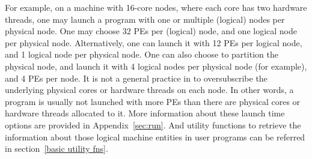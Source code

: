 For example, on a machine with 16-core nodes, where each core has two
hardware threads, one may launch a \charmpp{} program with one or multiple
(logical) nodes per physical node. One may choose 32 PEs per (logical) node,
and one logical node per physical node. Alternatively, one can launch
it with 12 PEs per logical node, and 1 logical node per physical
node. One can also choose to partition the physical node, and launch
it with 4 logical nodes per physical node (for example), and 4 PEs per
node. It is not a general practice in \charmpp{} to oversubscribe the underlying
physical cores or hardware threads on each node. In other words, a
\charmpp{} program is usually not launched with more PEs than there
are physical cores or hardware threads allocated to it. More information about
these launch time options are provided in Appendix~\ref{sec:run}.
And utility functions to retrieve the information about those
\charmpp{} logical machine entities in user programs can be referred
in section~\ref{basic utility fns}.
